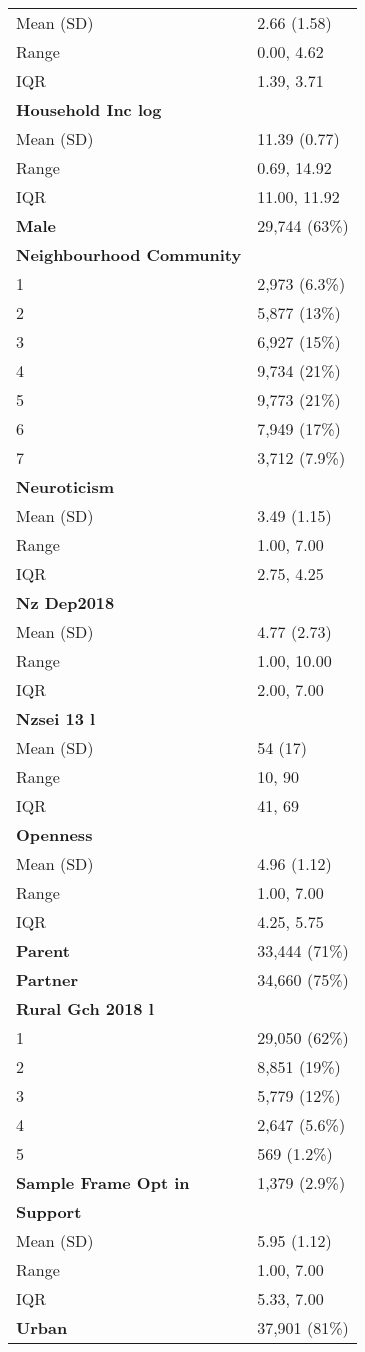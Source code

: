 \documentclass[
  singlecolumn]{article}
\begin{document}
\begin{longtable}[]{@{}ll@{}}
Mean (SD) & 2.66 (1.58) \\
Range & 0.00, 4.62 \\
IQR & 1.39, 3.71 \\
\textbf{Household Inc log} & \\
Mean (SD) & 11.39 (0.77) \\
Range & 0.69, 14.92 \\
IQR & 11.00, 11.92 \\
\textbf{Male} & 29,744 (63\%) \\
\textbf{Neighbourhood Community} & \\
1 & 2,973 (6.3\%) \\
2 & 5,877 (13\%) \\
3 & 6,927 (15\%) \\
4 & 9,734 (21\%) \\
5 & 9,773 (21\%) \\
6 & 7,949 (17\%) \\
7 & 3,712 (7.9\%) \\
\textbf{Neuroticism} & \\
Mean (SD) & 3.49 (1.15) \\
Range & 1.00, 7.00 \\
IQR & 2.75, 4.25 \\
\textbf{Nz Dep2018} & \\
Mean (SD) & 4.77 (2.73) \\
Range & 1.00, 10.00 \\
IQR & 2.00, 7.00 \\
\textbf{Nzsei 13 l} & \\
Mean (SD) & 54 (17) \\
Range & 10, 90 \\
IQR & 41, 69 \\
\textbf{Openness} & \\
Mean (SD) & 4.96 (1.12) \\
Range & 1.00, 7.00 \\
IQR & 4.25, 5.75 \\
\textbf{Parent} & 33,444 (71\%) \\
\textbf{Partner} & 34,660 (75\%) \\
\textbf{Rural Gch 2018 l} & \\
1 & 29,050 (62\%) \\
2 & 8,851 (19\%) \\
3 & 5,779 (12\%) \\
4 & 2,647 (5.6\%) \\
5 & 569 (1.2\%) \\
\textbf{Sample Frame Opt in} & 1,379 (2.9\%) \\
\textbf{Support} & \\
Mean (SD) & 5.95 (1.12) \\
Range & 1.00, 7.00 \\
IQR & 5.33, 7.00 \\
\textbf{Urban} & 37,901 (81\%) \\
\end{longtable}
\end{document}
